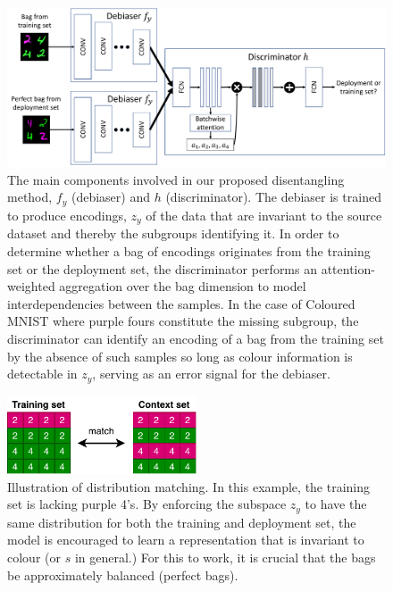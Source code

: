 \begin{figure}[t]
\centering
    \includegraphics[width=\textwidth]{paper3/figures/zsf_diagram.pdf}
    \caption{%
    The main components involved in our proposed disentangling method, $f_y$ (debiaser) and $h$ (discriminator). The debiaser is trained to produce encodings, $z_y$ of the data that are invariant to the source dataset and thereby the subgroups identifying it. In order to determine whether a bag of encodings originates from the training set or the deployment set, the discriminator performs an attention-weighted aggregation over the bag dimension to model interdependencies between the samples. In the case of Coloured MNIST where {\color{purple}purple} fours constitute the missing subgroup, the discriminator can identify an encoding of a bag from the training set by the absence of such samples so long as colour information is detectable in $z_y$, serving as an error signal for the debiaser.
    }%
    \label{fig:architecture}
\end{figure}%
\begin{figure}[t]
    \centering
    \includegraphics[width=0.5\textwidth]{paper3/figures/fdm.pdf}
    \caption{%
    Illustration of distribution matching.
    In this example, the training set is lacking {\color{purple}purple} 4's.
    By enforcing the subspace $z_y$ to have the same distribution for both the training and deployment set, the model is encouraged to learn a representation that is invariant to colour (or $s$ in general.)
    For this to work, it is crucial that the bags be approximately balanced (perfect bags).
    }%
    \label{fig:matching-diagram}
\end{figure}

